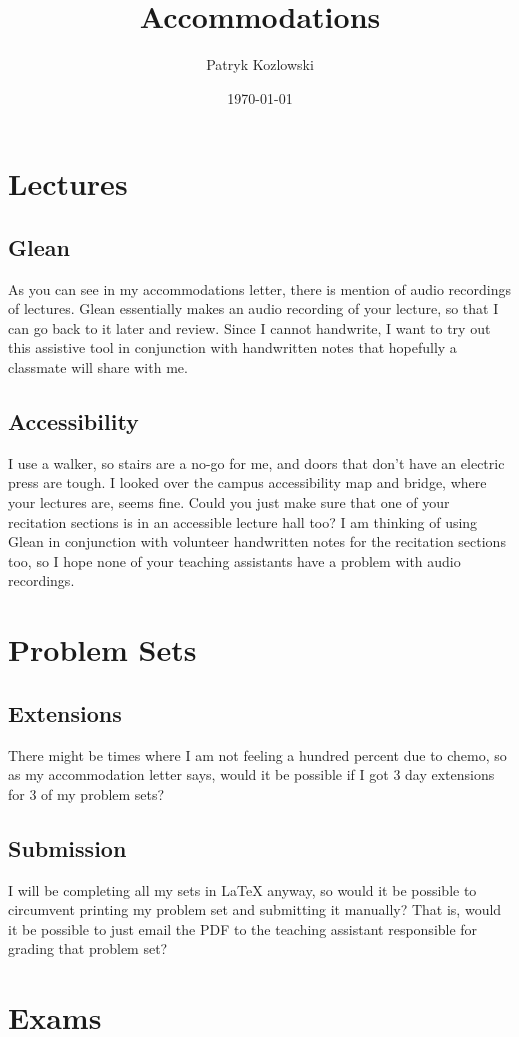 \documentclass[12pt]{article}
\title{Accommodations}
\author{Patryk Kozlowski}
\date{\today}
\begin{document}
\maketitle
\section{Lectures}
\subsection{Glean}
As you can see in my accommodations letter, there is mention of audio recordings of lectures. Glean essentially makes an audio recording of your lecture, so that I can go back to it later and review. Since I cannot handwrite, I want to try out this assistive tool in conjunction with handwritten notes that hopefully a classmate will share with me.
\subsection{Accessibility}
I use a walker, so stairs are a no-go for me, and doors that don't have an electric press are tough. I looked over the campus accessibility map and bridge, where your lectures are, seems fine. Could you just make sure that one of your recitation sections is in an accessible lecture hall too? I am thinking of using Glean in conjunction with volunteer handwritten notes for the recitation sections too, so I hope none of your teaching assistants have a problem with audio recordings.
\section{Problem Sets}
\subsection{Extensions}
There might be times where I am not feeling a hundred percent due to chemo, so as my accommodation letter says, would it be possible if I got 3 day extensions for 3 of my problem sets?
\subsection{Submission}
I will be completing all my sets in LaTeX anyway, so would it be possible to circumvent printing my problem set and submitting it manually? That is, would it be possible to just email the PDF to the teaching assistant responsible for grading that problem set?
\section{Exams}
\end{document}
